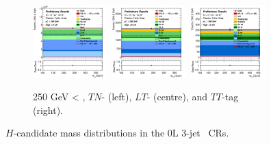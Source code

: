 \begin{figure}[h!]
\begin{subfigure}[b]{\textwidth}
        \includegraphics[width=0.32\textwidth]{Images/VH/Own_fit/postfit_VHcc/Region_distmBB_BMin250_DCRHigh_J3_TTypent_T1_L0_Y6051_GlobalFit_conditionnal_mu1.png}
        \includegraphics[width=0.32\textwidth]{Images/VH/Own_fit/postfit_VHcc/Region_distmBB_BMin250_DCRHigh_J3_TTypelt_T2_L0_Y6051_GlobalFit_conditionnal_mu1.png}
        \includegraphics[width=0.32\textwidth]{Images/VH/Own_fit/postfit_VHcc/Region_distmBB_BMin250_DCRHigh_J3_TTypett_T2_L0_Y6051_GlobalFit_conditionnal_mu1.png}
        \caption{250 GeV < \ptv, $TN$- (left), $LT$- (centre), and $TT$-tag (right).}
        \label{fig:plots_VHcc_OL_250_CRH_2c_3J}
    \end{subfigure}
    \caption{$H$-candidate mass distributions in the 0L 3-jet \highdr\ CRs.}
    \label{fig:plots_VHcc_OL_CRH_2c_3J}
\end{figure} 

\vspace*{\fill} 

